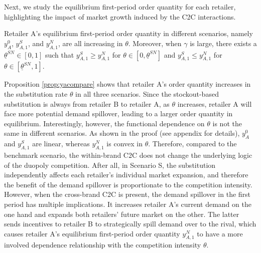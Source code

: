 \documentclass[nonblindrev,copyedit]{informs1}
\begin{document}
Next, we study the equilibrium first-period order quantity for each retailer, highlighting the impact of market growth induced by the C2C interactions.

\begin{proposition}
\label{prop:yacompare}
Retailer A's equilibrium first-period order quantity in different scenarios, namely $y^{0}_{A}$, $y^{S}_{A,1}$, and $y^{N}_{A,1}$, are all increasing in $\theta$. Moreover, when $\gamma$ is large, there exists a $\underline{\theta}^{SN} \in [0,1]$ such that $y^{S}_{A,1} \geq y^{N}_{A,1}$ for $\theta \in [0,\underline{\theta}^{SN}]$ and $y^{S}_{A,1} \leq y^{N}_{A,1}$ for $\theta \in [\underline{\theta}^{SN},1]$.
\end{proposition}

Proposition \ref{prop:yacompare} shows that retailer A's order quantity increases in the substitution rate $\theta$ in all three scenarios. Since the stockout-based substitution is always from retailer B to retailer A, as $\theta$ increases, retailer A will face more potential demand spillover, leading to a larger order quantity in equilibrium. Interestingly, however, the functional dependence on $\theta$ is not the same in different scenarios. As shown in the proof (see appendix for details), $y^0_{A}$ and $y^S_{A,1}$ are linear, whereas $y^N_{A,1}$ is convex in $\theta$. Therefore, compared to the benchmark scenario, the within-brand C2C does not change the underlying logic of the duopoly competition. After all, in Scenario S, the substitution independently affects each retailer's individual market expansion, and therefore the benefit of the demand spillover is proportionate to the competition intensity. However, when the cross-brand C2C is present, the demand spillover in the first period has multiple implications. It increases retailer A's current demand on the one hand and expands both retailers' future market on the other. The latter sends incentives to retailer B to strategically spill demand over to the rival, which causes retailer A's equilibrium first-period order quantity $y^N_{A,1}$ to have a more involved dependence relationship with the competition intensity $\theta$.
\end{document}
